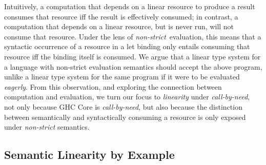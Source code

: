 \documentclass[acmsmall,review,anonymous]{acmart}
\begin{document}
Intuitively, a computation that depends on a linear resource to produce a
result consumes that resource iff the result is effectively consumed; in
contrast, a computation that depends on a linear resource, but is never run,
will not consume that resource.
Under the lens of \emph{non-strict} evaluation, this means that a syntactic
occurrence of a resource in a let binding only entails consuming that resource
iff the binding itself is consumed.
%
We argue that a linear type system for a language with non-strict evaluation
semantics should accept the above program, unlike a linear type system for the
same program if it were to be evaluated \emph{eagerly}.
%
From this observation, and exploring the connection between computation and evaluation,
%
we turn our focus to \emph{linearity} under \emph{call-by-need}, not only
because GHC Core is \emph{call-by-need}, but also because the distinction
between semantically and syntactically consuming a resource is only exposed
under \emph{non-strict} semantics.
%

% 
% 
% 

\subsection{Semantic Linearity by Example\label{sec:semantic-linearity-examples}}
\end{document}
